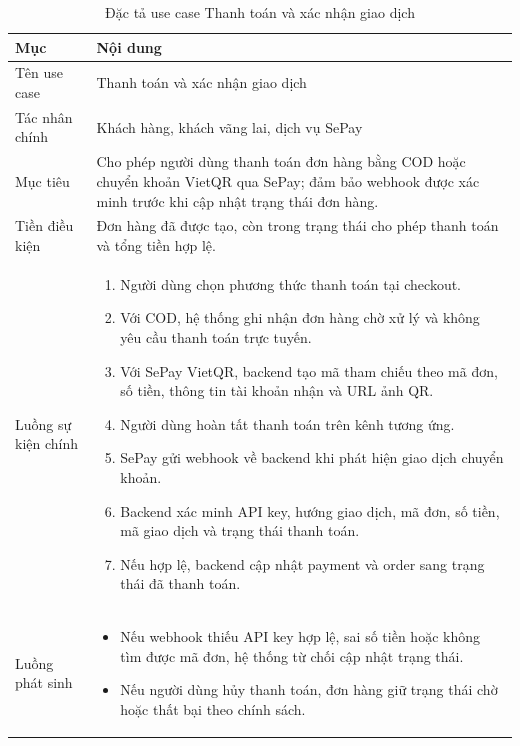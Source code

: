 \documentclass[../DoAn.tex]{subfiles}
\begin{document}
{\normalsize
\setlength{\LTleft}{\fill}
\setlength{\LTright}{\fill}
\setlength{\tabcolsep}{5pt}
\renewcommand{\arraystretch}{1.25}
\begin{longtable}{|p{3.2cm}|p{10.4cm}|}
\caption{Đặc tả use case Thanh toán và xác nhận giao dịch}
\label{table:2.7}\\
\hline
\textbf{Mục} & \textbf{Nội dung} \\ \hline
Tên use case & Thanh toán và xác nhận giao dịch \\ \hline
Tác nhân chính & Khách hàng, khách vãng lai, dịch vụ SePay \\ \hline
Mục tiêu & Cho phép người dùng thanh toán đơn hàng bằng COD hoặc chuyển khoản VietQR qua SePay; đảm bảo webhook được xác minh trước khi cập nhật trạng thái đơn hàng. \\ \hline
Tiền điều kiện & Đơn hàng đã được tạo, còn trong trạng thái cho phép thanh toán và tổng tiền hợp lệ. \\ \hline
Luồng sự kiện chính &
\begin{minipage}[t]{10.1cm}
\begin{enumerate}[leftmargin=*,topsep=0pt,itemsep=0pt]
    \item Người dùng chọn phương thức thanh toán tại checkout.
    \item Với COD, hệ thống ghi nhận đơn hàng chờ xử lý và không yêu cầu thanh toán trực tuyến.
    \item Với SePay VietQR, backend tạo mã tham chiếu theo mã đơn, số tiền, thông tin tài khoản nhận và URL ảnh QR.
    \item Người dùng hoàn tất thanh toán trên kênh tương ứng.
    \item SePay gửi webhook về backend khi phát hiện giao dịch chuyển khoản.
    \item Backend xác minh API key, hướng giao dịch, mã đơn, số tiền, mã giao dịch và trạng thái thanh toán.
    \item Nếu hợp lệ, backend cập nhật payment và order sang trạng thái đã thanh toán.
\end{enumerate}
\end{minipage} \\ \hline
Luồng phát sinh &
\begin{minipage}[t]{10.1cm}
\begin{itemize}[leftmargin=*,topsep=0pt,itemsep=0pt]
    \item Nếu webhook thiếu API key hợp lệ, sai số tiền hoặc không tìm được mã đơn, hệ thống từ chối cập nhật trạng thái.
    \item Nếu người dùng hủy thanh toán, đơn hàng giữ trạng thái chờ hoặc thất bại theo chính sách.

\end{itemize}
\end{minipage}
\end{longtable}}
\end{document}
